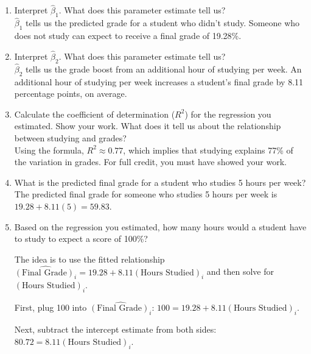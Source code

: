 \documentclass[11pt]{article}
\begin{document}
\begin{onehalfspacing}
\begin{enumerate}
\begin{enumerate}
	\item Interpret $\hat{\beta}_1$. What does this parameter estimate tell us?\\

	{\color{pine_green} $\hat{\beta}_1$ tells us the predicted grade for a student who didn't study. Someone who does not study can expect to receive a final grade of 19.28\%.
	}\\
	
	\item Interpret $\hat{\beta}_2$. What does this parameter estimate tell us?\\
	
	
	{\color{pine_green} $\hat{\beta}_2$ tells us the grade boost from an additional hour of studying per week. An additional hour of studying per week increases a student's final grade by 8.11 percentage points, on average.
	}\\

	\item Calculate the coefficient of determination ($R^2$) for the regression you estimated. Show your work. What does it tell us about the relationship between studying and grades?\\
	
	{\color{pine_green} Using the formula, $R^2 \approx 0.77$, which implies that studying explains 77\% of the variation in grades. For full credit, you must have showed your work.
	}\\

	\item What is the predicted final grade for a student who studies 5 hours per week?\\
	
	{\color{pine_green} The predicted final grade for someone who studies 5 hours per week is $19.28 + 8.11(5) = 59.83$.
	}\\

	\item Based on the regression you estimated, how many hours would a student have to study to expect a score of 100\%? \\


	{\color{pine_green} The idea is to use the fitted relationship $\hat{(\text{Final Grade})_i} = 19.28 + 8.11 (\text{Hours Studied})_i$ and then solve for $(\text{Hours Studied})_i$. 
		
		First, plug 100 into $\hat{(\text{Final Grade})_i}$: $100 = 19.28 + 8.11(\text{Hours Studied})_i$.
		
		Next, subtract the intercept estimate from both sides: $80.72 = 8.11(\text{Hours Studied})_i$.
		
}
\end{enumerate}
\end{enumerate}
\end{onehalfspacing}
\end{document}
